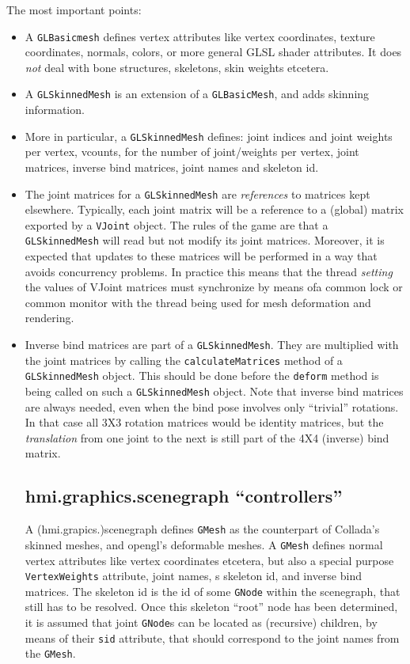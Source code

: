 The most important points:
\begin{itemize}
\item A \verb"GLBasicmesh" defines vertex attributes like vertex coordinates, texture coordinates, normals, colors,
or more general GLSL shader attributes. It does \emph{not} deal with bone structures, skeletons, skin weights etcetera.
\item A \verb"GLSkinnedMesh" is an extension of a \verb"GLBasicMesh", and adds skinning information.
\item More in particular, a \verb"GLSkinnedMesh" defines: joint indices and joint weights per vertex, vcounts,
for the number of joint/weights per vertex, joint matrices, inverse bind matrices, joint names and skeleton id.
\item The joint matrices for a \verb"GLSkinnedMesh" are \emph{references} to matrices kept elsewhere.
Typically, each joint matrix will be a reference to a (global) matrix exported by a \verb"VJoint" object.
The rules of the game are that a \verb"GLSkinnedMesh" will read but not modify its joint matrices.
Moreover, it is expected that updates to these matrices will be performed in a way that avoids concurrency problems.
In practice this means that the thread \emph{setting} the values of VJoint matrices must
synchronize by means ofa common lock or common monitor with the thread being used for mesh deformation and rendering.
\item Inverse bind matrices are part of a \verb"GLSkinnedMesh". They are multiplied with the joint matrices
by  calling the \verb"calculateMatrices" method of a \verb"GLSkinnedMesh" object. This should be done
before the \verb"deform" method is being called on such a \verb"GLSkinnedMesh" object.
Note that inverse bind matrices are always needed, even when the bind pose involves only ``trivial'' rotations.
In that case all 3X3 rotation matrices would be identity matrices, but the \emph{translation} from one joint to the next
is still part of the 4X4 (inverse) bind matrix.

\subsection {hmi.graphics.scenegraph ``controllers''}

A (hmi.grapics.)scenegraph defines \verb"GMesh" as the counterpart of Collada's skinned meshes, and opengl's deformable meshes.
A \verb"GMesh" defines normal vertex attributes like vertex coordinates etcetera, but also a special purpose
\verb"VertexWeights" attribute, joint names, s skeleton id, and inverse bind matrices.
The skeleton id is the id of some \verb"GNode" within the scenegraph, that still has to be resolved.
Once this skeleton ``root'' node has been determined, it is assumed that joint \verb"GNode"s can be located
as (recursive) children, by means of their \verb"sid" attribute, that should correspond to the joint names
from the \verb"GMesh".



\end{itemize}
